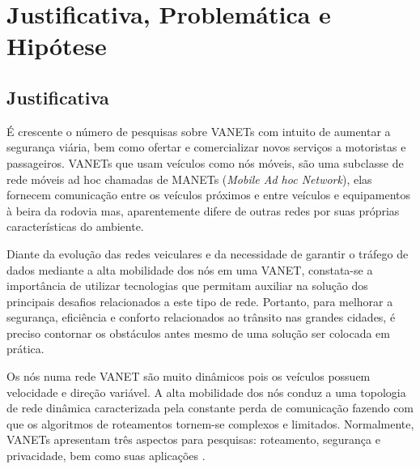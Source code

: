 \documentclass[
	12pt,				%
	oneside,			%
	a4paper,			%
	english,			%
	brazil				%
	]{abntex2ppgsi}
\begin{document}
%


\section{Justificativa, Problemática e Hipótese}

\subsection{Justificativa}

É crescente o número de pesquisas sobre VANETs  com intuito de aumentar a segurança viária, bem como ofertar e comercializar novos serviços a motoristas e passageiros. VANETs que usam veículos como nós móveis, são uma subclasse de rede móveis ad hoc chamadas de MANETs (\textit{Mobile Ad hoc Network}), elas fornecem comunicação entre os veículos próximos e entre veículos  e equipamentos à beira da rodovia mas, aparentemente difere de outras redes por suas próprias características do ambiente. 

Diante da evolução das redes veiculares e da necessidade de garantir o tráfego de dados mediante a alta mobilidade dos nós em uma VANET, constata-se a importância de utilizar tecnologias que permitam auxiliar na solução dos principais desafios relacionados a este tipo de rede.  Portanto, para melhorar a segurança, eficiência e conforto relacionados ao trânsito nas grandes cidades, é preciso contornar os obstáculos  antes mesmo de uma solução ser colocada em prática.  

Os nós numa rede VANET são muito dinâmicos pois os veículos possuem velocidade e direção variável. A alta mobilidade dos nós conduz a uma topologia de rede dinâmica caracterizada pela constante perda de comunicação fazendo com que os algoritmos de roteamentos tornem-se complexos e limitados. Normalmente, VANETs apresentam três aspectos para pesquisas: roteamento, segurança e privacidade, bem como suas aplicações \cite{liang2015vehicular}.
\end{document}
